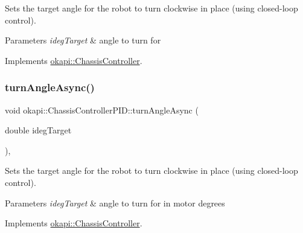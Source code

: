 Sets the target angle for the robot to turn clockwise in place (using closed-\/loop control).


\begin{DoxyParams}{Parameters}
{\em ideg\+Target} & angle to turn for \\
\hline
\end{DoxyParams}


Implements \mbox{\hyperlink{classokapi_1_1ChassisController_a87fc1f88bf06340d8f022a8c185b5e87}{okapi\+::\+Chassis\+Controller}}.

\mbox{\label{classokapi_1_1ChassisControllerPID_a3a16a11e8b0e11dbfb2a03b5685e509b}} 
\subsubsection{\texorpdfstring{turnAngleAsync()}{turnAngleAsync()}\hspace{0.1cm}{\footnotesize\ttfamily [2/2]}}
{\footnotesize\ttfamily void okapi\+::\+Chassis\+Controller\+P\+I\+D\+::turn\+Angle\+Async (\begin{DoxyParamCaption}\item[{double}]{ideg\+Target }\end{DoxyParamCaption})\hspace{0.3cm}{\ttfamily [override]}, {\ttfamily [virtual]}}

Sets the target angle for the robot to turn clockwise in place (using closed-\/loop control).


\begin{DoxyParams}{Parameters}
{\em ideg\+Target} & angle to turn for in motor degrees \\
\hline
\end{DoxyParams}


Implements \mbox{\hyperlink{classokapi_1_1ChassisController_a35cadd99478629637b4bd3a5e709871a}{okapi\+::\+Chassis\+Controller}}.

\mbox{\label{classokapi_1_1ChassisControllerPID_a736ca24bff70d502f5ff724ed88f9f62}} 
